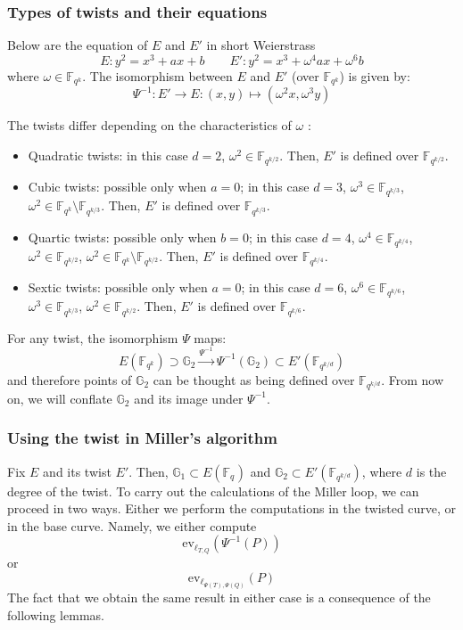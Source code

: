 \documentclass{article}
\newcommand{\gOne}{\mathbb{G}_1}
\newcommand{\gTwo}{\mathbb{G}_2}
\newcommand{\ev}{\mathrm{ev}}
\newcommand{\fq}[1]{\mathbb{F}_{q^{#1}}}
\theoremstyle{remark}
\theoremstyle{plain}
\begin{document}
\subsubsection{Types of twists and their equations}
Below are the equation of $E$ and $E'$ in short Weierstrass
\[
    E : y^2 = x^3 + ax + b \quad \quad E': y^2 = x^3 + \omega^4 a x + \omega^6 b
\]
where $\omega \in \fq{k}$.
The isomorphism between $E$ and $E'$ (over $\fq{k}$) is given by:
\[
    \Psi^{-1} \colon E' \rightarrow E: (x,y) \mapsto (\omega^2 x, \omega^3 y)
\]

The twists differ depending on the characteristics of $\omega$ \cite[Sec. 4.3]{C-pairings}:
\begin{itemize}
    \item Quadratic twists: in this case $d=2$, $\omega^2 \in \fq{k/2}$. Then, $E'$ is defined over $\fq{k/2}$.
    \item Cubic twists: possible only when $a = 0$; in this case $d=3$, $\omega^3 \in \fq{k/3}$, $\omega^2 \in \fq{k} \setminus \fq{k/3}$. Then, $E'$ is defined over $\fq{k/3}$.
    \item Quartic twists: possible only when $b = 0$; in this case $d=4$, $\omega^4 \in \fq{k/4}$, $\omega^2 \in \fq{k/2}$, $\omega^2 \in \fq{k} \setminus \fq{k/2}$. Then, $E'$ is defined over $\fq{k/4}$.
    \item Sextic twists: possible only when $a = 0$; in this case $d=6$, $\omega^6 \in \fq{k/6}$, $\omega^3 \in \fq{k/3}$, $\omega^2 \in \fq{k/2}$. Then, $E'$ is defined over $\fq{k/6}$.
\end{itemize}

For any twist, the isomorphism $\Psi$ maps:
\[
    E(\fq{k}) \supset \gTwo \overset{\Psi^{-1}}{\longrightarrow} \Psi^{-1}(\gTwo) \subset E'(\fq{k/d})
\]
and therefore points of $\gTwo$ can be thought as being defined over $\fq{k/d}$.
From now on, we will conflate $\gTwo$ and its image under $\Psi^{-1}$.

\subsubsection{Using the twist in Miller's algorithm}

Fix $E$ and its twist $E'$.
Then, $\gOne \subset E(\fq{})$ and $\gTwo \subset E'(\fq{k/d})$, where $d$ is the degree of the twist.
To carry out the calculations of the Miller loop, we can proceed in two ways.
Either we perform the computations in the twisted curve, or in the base curve.
Namely, we either compute
\[
    \ev_{\ell_{T,Q}}(\Psi^{-1}(P))
\]
or
\[
    \ev_{\ell_{\Psi(T),\Psi(Q)}}(P)
\]
The fact that we obtain the same result in either case is a consequence of the following lemmas.
\end{document}
